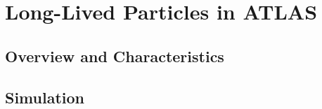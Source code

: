 \chapter{Long-Lived Particles in ATLAS}

\label{ch:simulation}

\section{Overview and Characteristics}


\section{Simulation}

